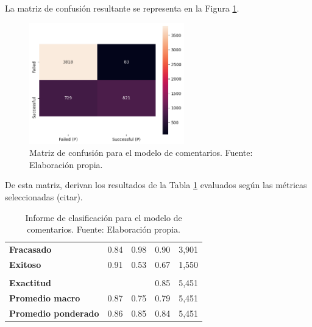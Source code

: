 La matriz de confusión resultante se representa en la Figura \ref{5:fig11}.
\begin{figure}[!ht]
	\begin{center}
		\includegraphics[width=0.60\textwidth]{4/figures/comments_confusion_matrix.png}
		\caption{Matriz de confusión para el modelo de comentarios. Fuente: Elaboración propia.}
		\label{5:fig11}
	\end{center}
\end{figure}

De esta matriz, derivan los resultados de la Tabla \ref{5:table3} evaluados según las métricas seleccionadas (citar).

\begin{table}[h!]
	\centering
	\small
	\begin{tabular}{ |m{4.5cm}|m{2.5cm}|m{2.5cm}|m{2.5cm}|m{2.5cm}|  }
		\hline
		\rowcolor{bluejean}
		\Centering \color{white}{Valor}& \Centering \color{white}{Precisión}& \Centering \color{white}{Sensibilidad}& \Centering \color{white}{Puntaje F1}& \Centering \color{white}{Muestras}\\
		\hline
		\textbf{Fracasado} & 0.84 & 0.98 & 0.90 & 3,901 \\
		\hline
		\textbf{Exitoso} & 0.91 & 0.53 & 0.67 & 1,550 \\
		\hline
		\rowcolor{turq}
		\multicolumn{5}{c}{ } \\
		\hline
		\textbf{Exactitud} &  &	 & 0.85 & 5,451 \\
		\hline
		\textbf{Promedio macro} & 0.87 & 0.75 & 0.79 & 5,451 \\
		\hline
		\textbf{Promedio ponderado} & 0.86 & 0.85 & 0.84 & 5,451 \\
		\hline
	\end{tabular}
	\caption{Informe de clasificación para el modelo de comentarios. Fuente: Elaboración propia.}
	\label{5:table3}
\end{table}


